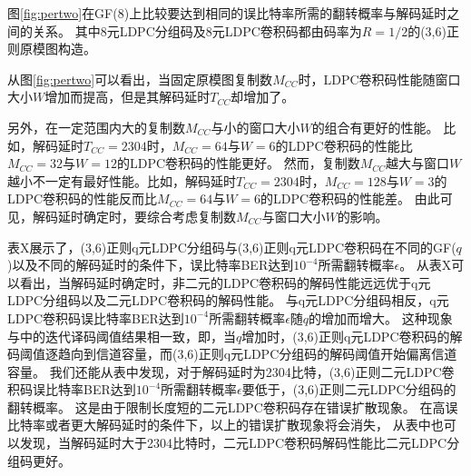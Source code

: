 图\ref{fig:pertwo}在GF($8$)上比较要达到相同的误比特率所需的翻转概率与解码延时之间的关系。
其中8元LDPC分组码及8元LDPC卷积码都由码率为$R=1/2$的(3,6)正则原模图构造。

从图\ref{fig:pertwo}可以看出，当固定原模图复制数$M_{CC}$时，LDPC卷积码性能随窗口大小$W$增加而提高，但是其解码延时$T_{CC}$却增加了。

另外，在一定范围内大的复制数$M_{CC}$与小的窗口大小$W$的组合有更好的性能。
比如，解码延时$T_{CC}=2304$时，$M_{CC}=64$与$W=6$的LDPC卷积码的性能比$M_{CC}=32$与$W=12$的LDPC卷积码的性能更好。
然而，复制数$M_{CC}$越大与窗口$W$越小不一定有最好性能。比如，解码延时$T_{CC}=2304$时，$M_{CC}=128$与$W=3$的LDPC卷积码的性能反而比$M_{CC}=64$与$W=6$的LDPC卷积码的性能差。
由此可见，解码延时确定时，要综合考虑复制数$M_{CC}$与窗口大小$W$的影响。

表X展示了，(3,6)正则q元LDPC分组码与(3,6)正则q元LDPC卷积码在不同的GF($q$)以及不同的解码延时的条件下，误比特率BER达到$10^{-4}$所需翻转概率$\epsilon$。
从表X可以看出，当解码延时确定时，非二元的LDPC卷积码的解码性能远远优于q元LDPC分组码以及二元LDPC卷积码的解码性能。
与q元LDPC分组码相反，q元LDPC卷积码误比特率BER达到$10^{-4}$所需翻转概率$\epsilon$随$q$的增加而增大。
这种现象与\cite{6874959}中的迭代译码阈值结果相一致，即，当$q$增加时，(3,6)正则q元LDPC卷积码的解码阈值逐趋向到信道容量，而(3,6)正则q元LDPC分组码的解码阈值开始偏离信道容量。
我们还能从表中发现，对于解码延时为2304比特，(3,6)正则二元LDPC卷积码误比特率BER达到$10^{-4}$所需翻转概率$\epsilon$要低于，(3,6)正则二元LDPC分组码的翻转概率。
这是由于限制长度短的二元LDPC卷积码存在错误扩散现象。
在高误比特率或者更大解码延时的条件下，以上的错误扩散现象将会消失，
从表中也可以发现，当解码延时大于2304比特时，二元LDPC卷积码解码性能比二元LDPC分组码更好。



